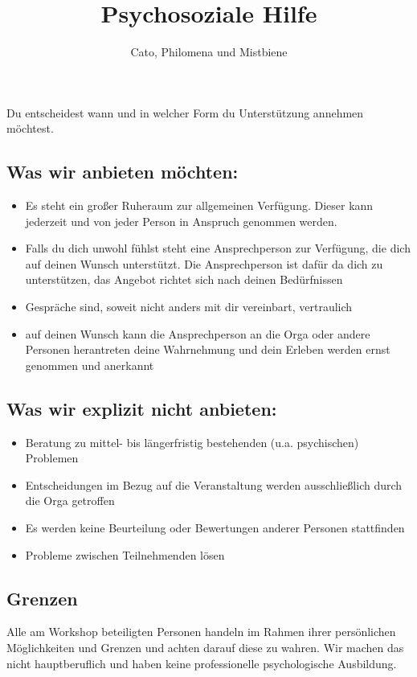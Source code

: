 \documentclass{article}
\title{Psychosoziale Hilfe}
\author{Cato, Philomena und Mistbiene}
\begin{document}
Du entscheidest wann und in welcher Form du Unterstützung annehmen möchtest.
\\
\subsection*{Was wir anbieten möchten:}
\begin{itemize}
    \item Es steht ein großer Ruheraum zur allgemeinen Verfügung. Dieser kann jederzeit und von jeder Person in Anspruch genommen werden.
    \item Falls du dich unwohl fühlst steht eine Ansprechperson zur Verfügung, die dich auf deinen Wunsch unterstützt. Die Ansprechperson ist dafür da dich zu unterstützen, das Angebot richtet sich nach deinen Bedürfnissen
    \item Gespräche sind, soweit nicht anders mit dir vereinbart, vertraulich
    \item auf deinen Wunsch kann die Ansprechperson an die Orga oder andere Personen herantreten
deine Wahrnehmung und dein Erleben werden ernst genommen und anerkannt
\end{itemize}

\subsection*{Was wir explizit nicht anbieten:}
\begin{itemize}
    \item Beratung zu mittel- bis längerfristig bestehenden (u.a. psychischen) Problemen
    \item Entscheidungen im Bezug auf die Veranstaltung werden ausschließlich durch die Orga getroffen
    \item Es werden keine Beurteilung oder Bewertungen anderer Personen stattfinden
    \item Probleme zwischen Teilnehmenden lösen
\end{itemize}
\subsection*{Grenzen}
Alle am Workshop beteiligten Personen handeln im Rahmen ihrer persönlichen Möglichkeiten und Grenzen und achten darauf diese zu wahren. Wir machen das nicht hauptberuflich und haben keine professionelle psychologische Ausbildung.
\end{document}
